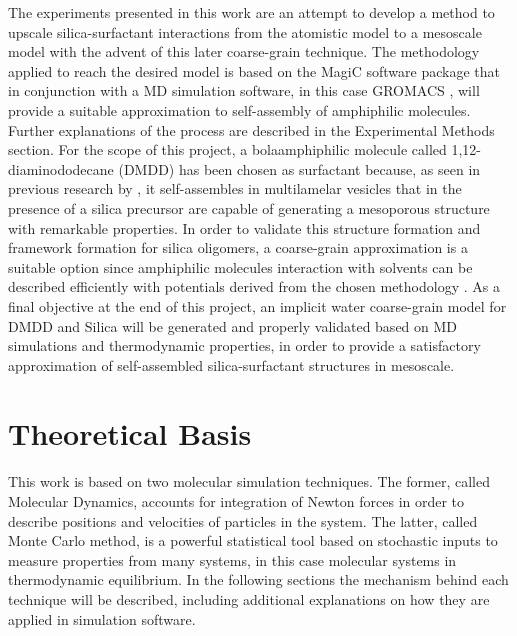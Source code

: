 \documentclass[10pt,a4paper,twoside]{article}
\begin{document}
The experiments presented in this work are an attempt to develop a  method to upscale silica-surfactant interactions \cite{silica1} from the atomistic model to a mesoscale model with the advent of this later coarse-grain technique. The methodology applied to reach the desired model is based on the MagiC software package \cite{magic} that in conjunction with a MD simulation software, in this case GROMACS \cite{gromacs}, will provide a suitable approximation to self-assembly of amphiphilic molecules. Further explanations of the process are described in the Experimental Methods section. For the scope of this project, a bolaamphiphilic molecule called 1,12-diaminododecane (DMDD) has been chosen as surfactant because, as seen in previous research by , it self-assembles in multilamelar vesicles that in the presence of a silica precursor are capable of generating a mesoporous structure with remarkable properties. In order to validate this structure formation and framework formation for silica oligomers, a coarse-grain approximation is a suitable option since amphiphilic molecules interaction with solvents can be described efficiently with potentials derived from the chosen methodology \cite{myproj}. As a final objective at the end of this project, an implicit water coarse-grain model for DMDD and Silica will be generated and properly validated based on MD simulations and thermodynamic properties, in order to provide a satisfactory approximation of self-assembled silica-surfactant structures in mesoscale. 


\section{Theoretical Basis}
This work is based on two molecular simulation techniques. The former, called Molecular Dynamics, accounts for integration of Newton forces in order to describe positions and velocities of particles in the system. The latter, called Monte Carlo method, is a powerful statistical tool based on stochastic inputs to measure properties from many systems, in this case molecular systems in thermodynamic equilibrium. In the following sections the mechanism behind each technique will be described, including additional explanations on how they are applied in simulation software.
\end{document}
